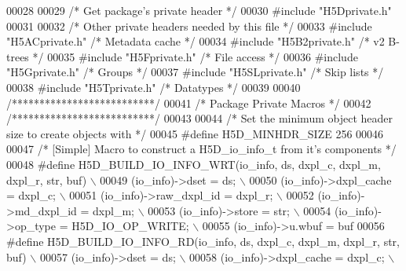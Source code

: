 \begin{DoxyCode}
00028 
00029 \textcolor{comment}{/* Get package's private header */}
00030 \textcolor{preprocessor}{#include "H5Dprivate.h"}
00031 
00032 \textcolor{comment}{/* Other private headers needed by this file */}
00033 \textcolor{preprocessor}{#include "H5ACprivate.h"}    \textcolor{comment}{/* Metadata cache           */}
00034 \textcolor{preprocessor}{#include "H5B2private.h"}        \textcolor{comment}{/* v2 B-trees                           */}
00035 \textcolor{preprocessor}{#include "H5Fprivate.h"}     \textcolor{comment}{/* File access              */}
00036 \textcolor{preprocessor}{#include "H5Gprivate.h"}     \textcolor{comment}{/* Groups               */}
00037 \textcolor{preprocessor}{#include "H5SLprivate.h"}    \textcolor{comment}{/* Skip lists               */}
00038 \textcolor{preprocessor}{#include "H5Tprivate.h"}     \textcolor{comment}{/* Datatypes                    */}
00039 
00040 \textcolor{comment}{/**************************/}
00041 \textcolor{comment}{/* Package Private Macros */}
00042 \textcolor{comment}{/**************************/}
00043 
00044 \textcolor{comment}{/* Set the minimum object header size to create objects with */}
00045 \textcolor{preprocessor}{#define H5D\_MINHDR\_SIZE 256}
00046 
00047 \textcolor{comment}{/* [Simple] Macro to construct a H5D\_io\_info\_t from it's components */}
00048 \textcolor{preprocessor}{#define H5D\_BUILD\_IO\_INFO\_WRT(io\_info, ds, dxpl\_c, dxpl\_m, dxpl\_r, str, buf)    \(\backslash\)}
00049 \textcolor{preprocessor}{    (io\_info)->dset = ds;                                               \(\backslash\)}
00050 \textcolor{preprocessor}{    (io\_info)->dxpl\_cache = dxpl\_c;                                     \(\backslash\)}
00051 \textcolor{preprocessor}{    (io\_info)->raw\_dxpl\_id = dxpl\_r;                                    \(\backslash\)}
00052 \textcolor{preprocessor}{    (io\_info)->md\_dxpl\_id = dxpl\_m;                                     \(\backslash\)}
00053 \textcolor{preprocessor}{    (io\_info)->store = str;                                             \(\backslash\)}
00054 \textcolor{preprocessor}{    (io\_info)->op\_type = H5D\_IO\_OP\_WRITE;                               \(\backslash\)}
00055 \textcolor{preprocessor}{    (io\_info)->u.wbuf = buf}
00056 \textcolor{preprocessor}{#define H5D\_BUILD\_IO\_INFO\_RD(io\_info, ds, dxpl\_c, dxpl\_m, dxpl\_r, str, buf) \(\backslash\)}
00057 \textcolor{preprocessor}{    (io\_info)->dset = ds;                                               \(\backslash\)}
00058 \textcolor{preprocessor}{    (io\_info)->dxpl\_cache = dxpl\_c;                                     \(\backslash\)}

\end{DoxyCode}
